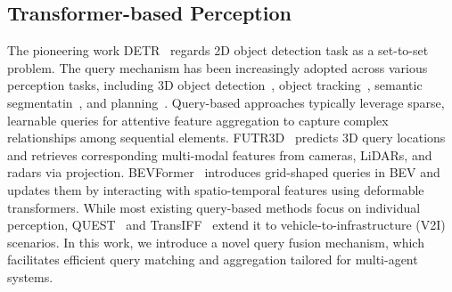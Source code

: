\subsection{Transformer-based Perception}
The pioneering work DETR~\cite{carion2020detr} regards 2D object detection task as a set-to-set problem. The query mechanism has been increasingly adopted across various perception tasks, including 3D object detection~\cite{wang2022detr3d,chen2022futr3d,chen2023transiff,fan2023quest}, object tracking~\cite{zeng2022motr,zhang2022mutr3d,pang2023pf-track,meinhardt2022trackformer}, semantic segmentatin~\cite{li2022bevformer,peng2022bevsegformer,maiti2023transfusion}, and planning~\cite{hu2023_uniad,yu2024_univ2x}. Query-based approaches typically leverage sparse, learnable queries for attentive feature aggregation to capture complex relationships among sequential elements. FUTR3D~\cite{chen2022futr3d} predicts 3D query locations and retrieves corresponding multi-modal features from cameras, LiDARs, and radars via projection. BEVFormer~\cite{li2022bevformer,yang2023bevformerv2} introduces grid-shaped queries in BEV and updates them by interacting with spatio-temporal features using deformable transformers. While most existing query-based methods focus on individual perception, QUEST~\cite{fan2023quest} and TransIFF~\cite{chen2023transiff} extend it to vehicle-to-infrastructure (V2I) scenarios. In this work, we introduce a novel query fusion mechanism, which facilitates efficient query matching and aggregation tailored for multi-agent systems.